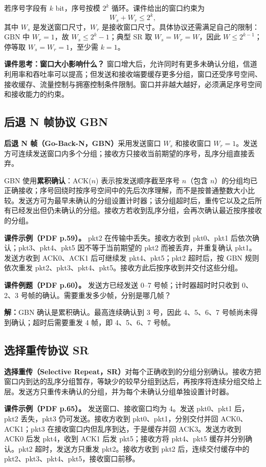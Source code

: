 若序号字段有 $k$ bit，序号按模 $2^k$ 循环。课件给出的窗口约束为
\[
 W_s+W_r\le 2^k,
\]
其中 $W_s$ 是发送窗口尺寸，$W_r$ 是接收窗口尺寸。具体协议还需满足自己的限制：GBN 中 $W_r=1$，故 $W_s\le2^k-1$；典型 SR 取 $W_s=W_r=W$，因此 $W\le2^{k-1}$；停等取 $W_s=W_r=1$，至少需 $k=1$。

\textbf{课件思考：窗口大小影响什么？} 窗口增大后，允许同时有更多未确认分组，信道利用率和吞吐率可以提高；但发送和接收端要缓存更多分组，窗口还受序号空间、接收缓存、流量控制与拥塞控制条件限制。窗口并非越大越好，必须满足序号空间和接收能力的约束。


\subsection{后退 N 帧协议 GBN}
\textbf{后退 N 帧（Go-Back-N，GBN）}采用发送窗口 $W_s$ 和接收窗口 $W_r=1$。发送方可连续发送窗口内多个分组；接收方只接收当前期望的序号，乱序分组直接丢弃。

GBN 使用\textbf{累积确认}：ACK($n$) 表示按发送顺序截至序号 $n$（包含 $n$）的分组均已正确接收；序号回绕时按序号空间中的先后次序理解，而不是按普通整数大小比较。发送方可为最早未确认的分组设置计时器；该分组超时后，重传它以及之后所有已经发出但仍未确认的分组。接收方若收到乱序分组，会再次确认最近按序接收的分组。

\textbf{课件示例（PDF p.59）。} pkt2 在传输中丢失。接收方收到 pkt0、pkt1 后依次确认；pkt3、pkt4、pkt5 因不等于当前期望的 pkt2 而被丢弃，并重复确认 pkt1。发送方收到 ACK0、ACK1 后可继续发 pkt4、pkt5；pkt2 超时后，按 GBN 规则依次重发 pkt2、pkt3、pkt4、pkt5。接收方此后按序收到并交付这些分组。

\textbf{课件例题（PDF p.60）。} 发送方已经发送 0--7 号帧；计时器超时时只收到 0、2、3 号帧的确认。需要重发多少帧，分别是哪几帧？

\textbf{解：}GBN 确认是累积确认。最高连续确认到 3 号，因此 4、5、6、7 号帧尚未得到确认；超时后需要重发 4 帧，即 4、5、6、7 号帧。


\subsection{选择重传协议 SR}
\textbf{选择重传（Selective Repeat，SR）}对每个正确收到的分组分别确认。接收方把窗口内到达的乱序分组暂存，等缺少的较早分组到达后，再按序将连续分组交给上层。发送方只重传未确认的分组，并为每个未确认分组单独设置计时器。

\textbf{课件示例（PDF p.65）。} 发送窗口、接收窗口均为 4。发送 pkt0、pkt1 后，pkt2 丢失，pkt3 仍可发送。接收方收到 pkt0、pkt1，分别交付并回 ACK0、ACK1；pkt3 在接收窗口内但乱序到达，于是缓存并回 ACK3。发送方收到 ACK0 后发 pkt4，收到 ACK1 后发 pkt5；接收方将 pkt4、pkt5 缓存并分别确认。pkt2 超时，发送方只重发 pkt2。接收方收到 pkt2 后，连续交付缓存中的 pkt2、pkt3、pkt4、pkt5，接收窗口前移。

